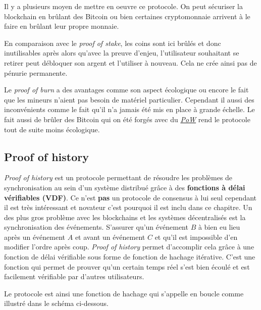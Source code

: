 Il y a plusieurs moyen de mettre en oeuvre ce protocole. On peut sécuriser la blockchain en brûlant des Bitcoin ou bien certaines cryptomonnaie arrivent à le faire en brûlant leur propre monnaie.

En comparaison avec le \textit{proof of stake}, les coins sont ici brûlés et donc inutilisables après alors qu'avec la preuve d'enjeu, l'utilisateur souhaitant se retirer peut débloquer son argent et l'utiliser à nouveau. Cela ne crée ainsi pas de pénurie permanente.

Le \textit{proof of burn} a des avantages comme son aspect écologique ou encore le fait que les mineurs n'aient pas besoin de matériel particulier. Cependant il aussi des inconvénients comme le fait qu'il n'a jamais été mis en place à grande échelle. Le fait aussi de brûler des Bitcoin qui on été forgés avec du \hyperref[consensus:pow]{\textit{PoW}} rend le protocole tout de suite moins écologique.

\subsection{Proof of history}

\textit{Proof of history} \cite{proof:poh} est un protocole permettant de résoudre les problèmes de synchronisation au sein d'un système distribué grâce à des \textbf{fonctions à délai vérifiables (VDF)}. Ce n'est \textbf{pas} un protocole de consensus à lui seul cependant il est très intéressant et novateur c'est pourquoi il est inclu dans ce chapitre. Un des plus gros problème avec les blockchains et les systèmes décentralisés est la synchronisation des événements. S'assurer qu'un événement $B$ à bien eu lieu après un événement $A$ et avant un événement $C$ et qu'il est impossible d'en modifier l'ordre après coup. \textit{Proof of history} permet d'accomplir cela grâce à une fonction de délai vérifiable sous forme de fonction de hachage itérative. C'est une fonction qui permet de prouver qu'un certain temps réel s'est bien écoulé et est facilement vérifiable par d'autres utilisateurs.

Le protocole est ainsi une fonction de hachage qui s'appelle en boucle comme illustré dans le schéma ci-dessous.

